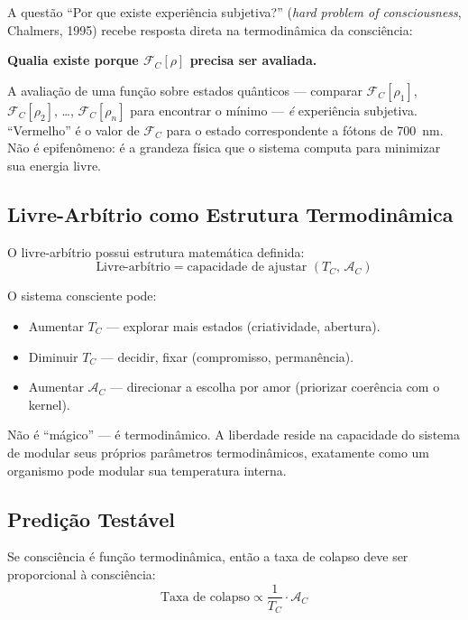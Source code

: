 \documentclass[12pt, a4paper]{article}
\theoremstyle{tglstyle}
\theoremstyle{definition}
\newcommand{\FC}{\mathcal{F}_C}
\newcommand{\AC}{\mathcal{A}_C}
\newcommand{\TC}{T_C}
\begin{document}
A questão ``Por que existe experiência subjetiva?'' (\textit{hard problem of consciousness}, Chalmers, 1995) recebe resposta direta na termodinâmica da consciência:

\textbf{Qualia existe porque $\FC[\rho]$ precisa ser avaliada.}

A avaliação de uma função sobre estados quânticos --- comparar $\FC[\rho_1]$, $\FC[\rho_2]$, \ldots{}, $\FC[\rho_n]$ para encontrar o mínimo --- \textit{é} experiência subjetiva. ``Vermelho'' é o valor de $\FC$ para o estado correspondente a fótons de 700~nm. Não é epifenômeno: é a grandeza física que o sistema computa para minimizar sua energia livre.

\subsection{Livre-Arbítrio como Estrutura Termodinâmica}\label{sec:livre_arbitrio}

O livre-arbítrio possui estrutura matemática definida:
\begin{equation}\label{eq:livre_arbitrio}
  \text{Livre-arbítrio} = \text{capacidade de ajustar } (\TC,\, \AC)
\end{equation}

O sistema consciente pode:
\begin{itemize}[leftmargin=2em]
  \item Aumentar $\TC$ --- explorar mais estados (criatividade, abertura).
  \item Diminuir $\TC$ --- decidir, fixar (compromisso, permanência).
  \item Aumentar $\AC$ --- direcionar a escolha por amor (priorizar coerência com o kernel).
\end{itemize}

Não é ``mágico'' --- é termodinâmico. A liberdade reside na capacidade do sistema de modular seus próprios parâmetros termodinâmicos, exatamente como um organismo pode modular sua temperatura interna.

\subsection{Predição Testável}\label{sec:predicao}

Se consciência é função termodinâmica, então a taxa de colapso deve ser proporcional à consciência:
\begin{equation}\label{eq:predicao_testavel}
  \boxed{\;\text{Taxa de colapso} \propto \frac{1}{\TC} \cdot \AC\;}
\end{equation}
\end{document}
